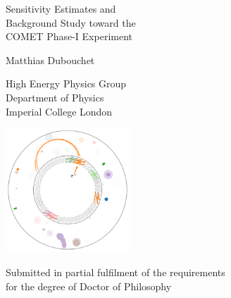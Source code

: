 \documentclass[12pt, a4paper, twoside]{report}
\begin{document}
\thispagestyle{empty}


\vspace*{\fill}

\begin{center}
    
    {\huge Sensitivity Estimates and\\[-0.2cm]
    Background Study toward the \\[-0.2cm]
    COMET Phase-I Experiment \par }%

    \vspace{1cm}
    
    {\Large Matthias Dubouchet}

    \vspace{0.8cm}
    
{\large
High Energy Physics Group\\[-0.2cm]
Department of Physics\\[-0.2cm]
Imperial College London \par
}


    \vspace{1.5cm}
    \includegraphics[width=0.35\textwidth]{title_page_graphic.png}
    \vspace{1cm}
    
    {\large Submitted in partial fulfilment of the requirements\\for the degree
    of Doctor of Philosophy}
    
\end{center}

\vspace*{\fill}
\clearpage

\shipout\null








\tableofcontents
\printglossary[type=\acronymtype]
\cleardoublepage











\clearpage
\appendix


\printbibliography

\listoffigures
\listoftables
\end{document}
